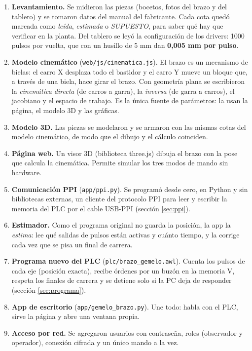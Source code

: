 \documentclass[a4paper,11pt]{article}
\newcommand{\codigo}[1]{\texttt{#1}}
\begin{document}
\begin{enumerate}
\item \textbf{Levantamiento.} Se midieron las piezas (bocetos, fotos del brazo y del tablero) y se tomaron datos del manual del fabricante. Cada cota quedó marcada como \emph{leída}, \emph{estimada} o \emph{SUPUESTO}, para saber qué hay que verificar en la planta. Del tablero se leyó la configuración de los drivers: 1000 pulsos por vuelta, que con un husillo de 5 mm dan \textbf{0,005 mm por pulso}.
\item \textbf{Modelo cinemático} (\codigo{web/js/cinematica.js}). El brazo es un mecanismo de bielas: el carro X desplaza todo el bastidor y el carro Y mueve un bloque que, a través de una biela, hace girar el brazo. Con geometría plana se escribieron la \emph{cinemática directa} (de carros a garra), la \emph{inversa} (de garra a carros), el jacobiano y el espacio de trabajo. Es la única fuente de parámetros: la usan la página, el modelo 3D y las gráficas.
\item \textbf{Modelo 3D.} Las piezas se modelaron y se armaron con las mismas cotas del modelo cinemático, de modo que el dibujo y el cálculo coinciden.
\item \textbf{Página web.} Un visor 3D (biblioteca three.js) dibuja el brazo con la pose que calcula la cinemática. Permite simular los tres modos de mando sin hardware.
\item \textbf{Comunicación PPI} (\codigo{app/ppi.py}). Se programó desde cero, en Python y sin bibliotecas externas, un cliente del protocolo PPI para leer y escribir la memoria del PLC por el cable USB-PPI (sección \ref{sec:ppi}).
\item \textbf{Estimador.} Como el programa original no guarda la posición, la app la \emph{estima}: lee qué salidas de pulsos están activas y cuánto tiempo, y la corrige cada vez que se pisa un final de carrera.
\item \textbf{Programa nuevo del PLC} (\codigo{plc/brazo\_gemelo.awl}). Cuenta los pulsos de cada eje (posición exacta), recibe órdenes por un buzón en la memoria V, respeta los finales de carrera y se detiene solo si la PC deja de responder (sección \ref{sec:programa}).
\item \textbf{App de escritorio} (\codigo{app/gemelo\_brazo.py}). Une todo: habla con el PLC, sirve la página y abre una ventana propia.
\item \textbf{Acceso por red.} Se agregaron usuarios con contraseña, roles (observador y operador), conexión cifrada y un único mando a la vez.
\end{enumerate}
\end{document}

